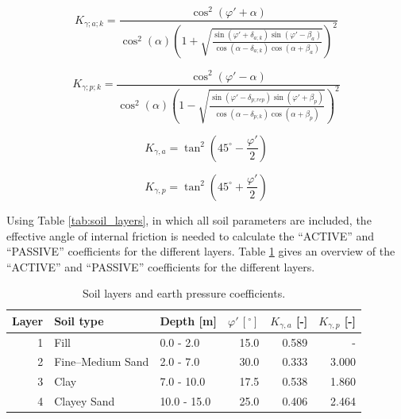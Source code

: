\begin{equation}
    K_{\gamma;a;k} =
    \frac{
        \cos^{2}\!\left(\varphi' + \alpha\right)
    }{
        \cos^{2}(\alpha)
        \left(
            1 +
            \sqrt{
                \frac{
                    \sin\!\left(\varphi' + \delta_{a;k}\right)
                    \sin\!\left(\varphi' - \beta_a\right)
                }{
                    \cos\!\left(\alpha - \delta_{a;k}\right)
                    \cos\!\left(\alpha + \beta_a\right)
                }
            }
        \right)^{2}
    }
    \label{eq:K_gamma_a_k}
\end{equation}

\begin{equation}
    K_{\gamma;p;k} =
    \frac{
        \cos^{2}\!\left(\varphi' - \alpha\right)
    }{
        \cos^{2}(\alpha)
        \left(
            1 -
            \sqrt{
                \frac{
                    \sin\!\left(\varphi' - \delta_{p;rep}\right)
                    \sin\!\left(\varphi' + \beta_p\right)
                }{
                    \cos\!\left(\alpha - \delta_{p;k}\right)
                    \cos\!\left(\alpha + \beta_p\right)
                }
            }
        \right)^{2}
    }
    \label{eq:K_gamma_p_k}
\end{equation}

\begin{equation}
    K_{\gamma,a} = \tan^{2}\!\left(45^\circ - \frac{\varphi'}{2}\right)
    \label{eq:Ka_tan}
\end{equation}

\begin{equation}
    K_{\gamma,p} = \tan^{2}\!\left(45^\circ + \frac{\varphi'}{2}\right)
    \label{eq:Kp_tan}
\end{equation}

Using Table \ref{tab:soil_layers}, in which all soil parameters are included, the effective angle of internal friction is needed to calculate the “ACTIVE” and “PASSIVE” coefficients for the different layers. Table \ref{tab:layers_ka_kp} gives an overview of the “ACTIVE” and “PASSIVE” coefficients for the different layers. 

\begin{table}[H]
  \centering
  \caption{Soil layers and earth pressure coefficients.}
  \label{tab:layers_ka_kp}
  \small
  \setlength{\tabcolsep}{8pt}
  \renewcommand{\arraystretch}{1.15}
  \begin{tabular}{@{}r l l r r r@{}}
    \toprule
    Layer & Soil type & Depth [m] &
    $\varphi'\,[\boldsymbol{^\circ}]$ &
    $K_{\gamma,a}$ [-] & $K_{\gamma,p}$ [-] \\
    \midrule
    1 & Fill             & 0.0 - 2.0   & 15.0 & 0.589 & - \\
    2 & Fine--Medium Sand& 2.0 - 7.0   & 30.0 & 0.333 & 3.000 \\
    3 & Clay             & 7.0 - 10.0  & 17.5 & 0.538 & 1.860 \\
    4 & Clayey Sand      & 10.0 - 15.0 & 25.0 & 0.406 & 2.464 \\
    \bottomrule 
  \end{tabular}
\end{table}


